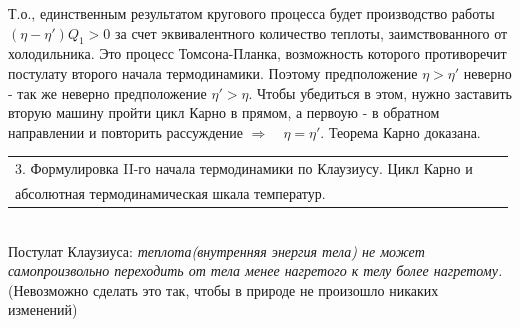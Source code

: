 \documentclass[14pt,a4paper]{scrartcl}
\begin{document}
		\quad Т.о., единственным результатом кругового процесса будет производство работы $ (\eta - \eta')Q_1 > 0 $ за счет эквивалентного количество теплоты, заимствованного от холодильника. Это процесс Томсона-Планка, возможность которого противоречит постулату второго начала термодинамики. Поэтому предположение $\eta > \eta'$ неверно - так же неверно предположение $\eta' > \eta $. Чтобы убедиться в этом, нужно заставить вторую машину пройти цикл Карно в прямом, а первоую - в обратном направлении и повторить рассуждение $\Rightarrow\quad \eta = \eta'$. Теорема Карно доказана.
		
		
		\begin{tabular}[t]{|l|ll|} 
			\hline
			3. Формулировка II-го начала термодинамики по Клаузиусу. Цикл Карно и\\
			абсолютная термодинамическая шкала температур.\\
			\hline
		\end{tabular}\\
		
		\quad Постулат Клаузиуса: \textit{теплота(внутренняя энергия тела) не может самопроизвольно переходить от тела менее нагретого к телу более нагретому.} (Невозможно сделать это так, чтобы в природе не произошло никаких изменений)\\
 		
\end{document}
